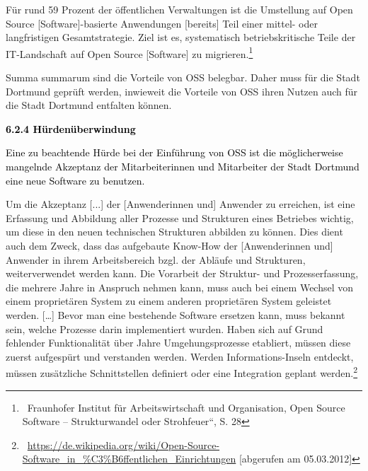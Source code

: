\documentclass[a4paper]{article}
\newcommand\textstyleInternetlink[1]{\foreignlanguage{english}{\textcolor[rgb]{0.0,0.0,0.5019608}{#1}}}
\begin{document}
\bigskip

{
{\guillemotright}F\"ur rund 59 Prozent der \"offentlichen Verwaltungen
ist die Umstellung auf Open Source [Software]-basierte Anwendungen
[bereits] Teil einer mittel- oder langfristigen Gesamtstrategie. Ziel
ist es, systematisch betriebskritische Teile der IT-Landschaft auf Open
Source [Software] zu migrieren.{\guillemotleft}\footnote{\ Fraunhofer
Institut f\"ur Arbeitswirtschaft und Organisation, {\quotedblbase}Open
Source Software -- Strukturwandel oder Strohfeuer{\textquotedblleft},
S. 28}}


\bigskip

{
Summa summarum sind die Vorteile von OSS belegbar. Daher muss f\"ur die
Stadt Dortmund gepr\"uft werden, inwieweit die Vorteile von OSS ihren
Nutzen auch f\"ur die Stadt Dortmund entfalten k\"onnen.}


\bigskip


\bigskip

{
\hypertarget{Hrdenberwindung}{}\textbf{\textcolor{black}{6.2.4}}\textbf{\textcolor{black}{
H\"urden\"uberwindung}}}


\bigskip

{
\textcolor{black}{Eine zu beachtende H\"urde bei der Einf\"uhrung von
OSS ist die m\"oglicherweise mangelnde Akzeptanz der Mitarbeiterinnen
und Mitarbeiter der Stadt Dortmund eine neue Software zu benutzen.}}

{
{\guillemotright}Um die Akzeptanz [...] der [Anwenderinnen und] Anwender
zu erreichen, ist eine Erfassung und Abbildung aller Prozesse und
Strukturen eines Betriebes wichtig, um diese in den neuen technischen
Strukturen abbilden zu k\"onnen. Dies dient auch dem Zweck, dass das
aufgebaute Know-How der [Anwenderinnen und] Anwender in ihrem
Arbeitsbereich bzgl. der Abl\"aufe und Strukturen, weiterverwendet
werden kann. Die Vorarbeit der Struktur- und Prozesserfassung, die
mehrere Jahre in Anspruch nehmen kann, muss auch bei einem Wechsel von
einem propriet\"aren System zu einem anderen propriet\"aren System
geleistet werden. [{\dots}] Bevor man eine bestehende Software ersetzen
kann, muss bekannt sein, welche Prozesse darin implementiert wurden.
Haben sich auf Grund fehlender Funktionalit\"at \"uber Jahre
Umgehungsprozesse etabliert, m\"ussen diese zuerst aufgesp\"urt und
verstanden werden. Werden Informations-Inseln entdeckt, m\"ussen
zus\"atzliche Schnittstellen definiert oder eine Integration geplant
werden.{\guillemotleft}\footnote{\ \href{https://de.wikipedia.org/wiki/Open-Source-Software_in_?ffentlichen_Einrichtungen}{\textstyleInternetlink{https://de.wikipedia.org/wiki/Open-Source-Software\_in\_\%C3\%B6ffentlichen\_Einrichtungen}}
[abgerufen am 05.03.2012]}}
\end{document}
